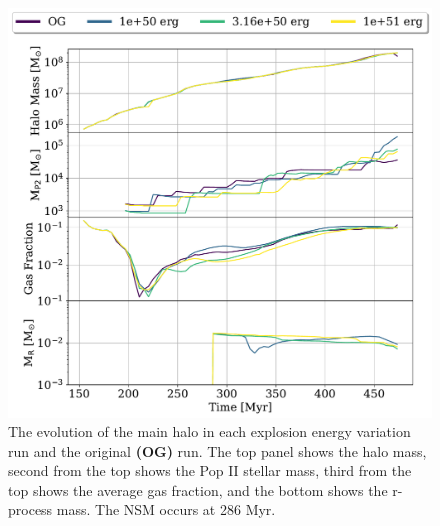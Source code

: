 \documentclass[fleqn,usenatbib]{mnras}
\begin{document}
\begin{figure} 
	\includegraphics[width=\columnwidth]{plots/eng_evolution.pdf}
	\caption[The halo mass, Pop II stellar mass, gas fraction, and r-process mass as a function of time for the explosion energy variation runs.]{The evolution of the main halo in each explosion energy variation run and the original \textbf{(OG)} run. The top panel shows the halo mass, second from the top shows the Pop II stellar mass, third from the top shows the average gas fraction, and the bottom shows the r-process mass. The NSM occurs at 286 Myr.}
	\label{fig:eng_evol}
\end{figure}
\end{document}

